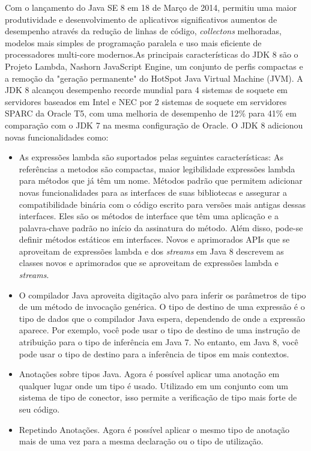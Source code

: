Com o lançamento do Java SE 8 em 18 de Março de 2014, permitiu uma maior produtividade e desenvolvimento de aplicativos significativos aumentos de desempenho através da redução de linhas de código, {\it collectons} melhoradas, modelos mais simples de programação paralela e uso mais eficiente de processadores multi-core modernos.As principais características do \acs{JDK} 8 são o Projeto Lambda, Nashorn JavaScript Engine, um conjunto de perfis compactas e a remoção da "geração permanente" do HotSpot Java Virtual Machine (\acs{JVM}). A \acs{JDK} 8 alcançou desempenho recorde mundial para 4 sistemas de soquete em servidores baseados em Intel e NEC por 2 sistemas de soquete em servidores SPARC da Oracle T5, com uma melhoria de desempenho de 12\% para 41\% em comparação com o JDK 7 na mesma configuração de Oracle.
O \acs{JDK} 8 adicionou novas funcionalidades como:
  \begin{itemize}
  \item As expressões lambda são suportados pelas seguintes características: As referências a metodos são compactas, maior legibilidade expressões lambda para métodos que já têm um nome. Métodos padrão que permitem adicionar novas funcionalidades para as interfaces de suas bibliotecas e assegurar a compatibilidade binária com o código escrito para versões mais antigas dessas interfaces. Eles são os métodos de interface que têm uma aplicação e a palavra-chave padrão no início da assinatura do método. Além disso, pode-se definir métodos estáticos em interfaces. Novos e aprimorados APIs que se aproveitam de expressões lambda e dos {\it streams} em Java 8 descrevem as classes novos e aprimorados que se aproveitam de expressões lambda e {\it streams}.
  \item O compilador Java aproveita digitação alvo para inferir os parâmetros de tipo de um método de invocação genérica. O tipo de destino de uma expressão é o tipo de dados que o compilador Java espera, dependendo de onde a expressão aparece. Por exemplo, você pode usar o tipo de destino de uma instrução de atribuição para o tipo de inferência em Java 7. No entanto, em Java 8, você pode usar o tipo de destino para a inferência de tipos em mais contextos.
  \item Anotações sobre tipos Java. Agora é possível aplicar uma anotação em qualquer lugar onde um tipo é usado. Utilizado em um conjunto com um sistema de tipo de conector, isso permite a verificação de tipo mais forte de seu código.
  \item  Repetindo Anotações. Agora é possível aplicar o mesmo tipo de anotação mais de uma vez para a mesma declaração ou o tipo de utilização.\\
  \end{itemize}


								